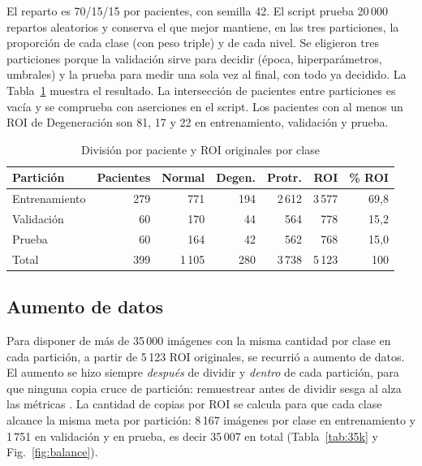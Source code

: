 El reparto es 70/15/15 por pacientes, con semilla 42. El script prueba 20\,000 repartos aleatorios y conserva el que mejor mantiene, en las tres particiones, la proporción de cada clase (con peso triple) y de cada nivel. Se eligieron tres particiones porque la validación sirve para decidir (época, hiperparámetros, umbrales) y la prueba para medir una sola vez al final, con todo ya decidido. La Tabla~\ref{tab:split} muestra el resultado. La intersección de pacientes entre particiones es vacía y se comprueba con aserciones en el script. Los pacientes con al menos un ROI de Degeneración son 81, 17 y 22 en entrenamiento, validación y prueba.

\begin{table}[!htb]
\centering\footnotesize
\setlength{\tabcolsep}{3.5pt}
\caption{División por paciente y ROI originales por clase}
\label{tab:split}
\begin{tabular}{lrrrrrr}
\toprule
Partición & Pacientes & Normal & Degen. & Protr. & ROI & \% ROI \\
\midrule
Entrenamiento & 279 & 771   & 194 & 2\,612 & 3\,577 & 69,8 \\
Validación    & 60  & 170   & 44  & 564    & 778    & 15,2 \\
Prueba        & 60  & 164   & 42  & 562    & 768    & 15,0 \\
\midrule
Total         & 399 & 1\,105 & 280 & 3\,738 & 5\,123 & 100 \\
\bottomrule
\end{tabular}
\end{table}

\subsection{Aumento de datos}
\label{sec:aumento}
Para disponer de más de 35\,000 imágenes con la misma cantidad por clase en cada partición, a partir de 5\,123 ROI originales, se recurrió a aumento de datos. El aumento se hizo siempre \emph{después} de dividir y \emph{dentro} de cada partición, para que ninguna copia cruce de partición: remuestrear antes de dividir sesga al alza las métricas \cite{demircioglu2024}. La cantidad de copias por ROI se calcula para que cada clase alcance la misma meta por partición: 8\,167 imágenes por clase en entrenamiento y 1\,751 en validación y en prueba, es decir 35\,007 en total (Tabla~\ref{tab:35k} y Fig.~\ref{fig:balance}).

